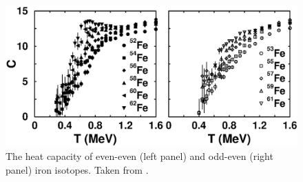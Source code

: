 \documentclass[rmp,aps,floatfix]{revtex4}
\begin{document}
\begin{figure}
\includegraphics[scale=0.5,angle=0]{dean_hjorthjensen_fig21.ps}
\caption{The heat capacity of even-even (left panel) and
odd-even (right panel) iron isotopes. Taken from  \protect\cite{liu01}.
\label{fig:figyoram}}
\end{figure}
\end{document}
